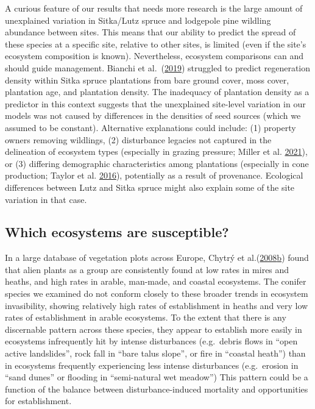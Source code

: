 \documentclass[
]{article}
\begin{document}
A curious feature of our results that needs more research is the large amount of unexplained variation in Sitka/Lutz spruce and lodgepole pine wildling abundance between sites.
This means that our ability to predict the spread of these species at a specific site, relative to other sites, is limited (even if the site's ecosystem composition is known).
Nevertheless, ecosystem comparisons can and should guide management.
Bianchi et al.~(\protect\hyperlink{ref-bianchiMethodsPredictingSitka2019}{2019}) struggled to predict regeneration density within Sitka spruce plantations from bare ground cover, moss cover, plantation age, and plantation density.
The inadequacy of plantation density as a predictor in this context suggests that the unexplained site-level variation in our models was not caused by differences in the densities of seed sources (which we assumed to be constant).
Alternative explanations could include: (1) property owners removing wildlings, (2) disturbance legacies not captured in the delineation of ecosystem types (especially in grazing pressure; Miller et al. \protect\hyperlink{ref-millerHowDisturbanceHistory2021}{2021}), or (3) differing demographic characteristics among plantations (especially in cone production; Taylor et al. \protect\hyperlink{ref-taylorDriversPlantInvasion2016}{2016}), potentially as a result of provenance.
Ecological differences between Lutz and Sitka spruce might also explain some of the site variation in that case.

\hypertarget{which-ecosystems-are-susceptible}{%
\subsection{Which ecosystems are susceptible?}\label{which-ecosystems-are-susceptible}}

In a large database of vegetation plots across Europe, Chytrý et al.(\protect\hyperlink{ref-chytryHabitatInvasionsAlien2008}{2008}\protect\hyperlink{ref-chytryHabitatInvasionsAlien2008}{b}) found that alien plants as a group are consistently found at low rates in mires and heaths, and high rates in arable, man-made, and coastal ecosystems.
The conifer species we examined do not conform closely to these broader trends in ecosystem invasibility, showing relatively high rates of establishment in heaths and very low rates of establishment in arable ecosystems.
To the extent that there is any discernable pattern across these species, they appear to establish more easily in ecosystems infrequently hit by intense disturbances (e.g.~debris flows in ``open active landslides'', rock fall in ``bare talus slope'', or fire in ``coastal heath'') than in ecosystems frequently experiencing less intense disturbances (e.g.~erosion in ``sand dunes'' or flooding in ``semi-natural wet meadow'')
This pattern could be a function of the balance between disturbance-induced mortality and opportunities for establishment.
\end{document}
